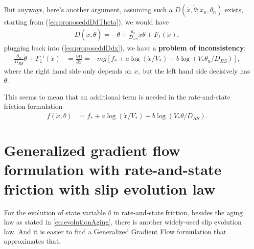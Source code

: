 But anyways, 
here's another argument, 
assuming such a $D(\dot{x}, \dot{\theta}; x_n, \theta_n)$ exists, 
starting from (\ref{eq:proposeddDdTheta}), 
we would have 
\begin{align}
    D(\dot{x}, \dot{\theta}) = -\dot{\theta} + \frac{\theta_n}{D_{RS}} \dot{x}\dot{\theta} + F_1(\dot{x}) \label{eq:DefF1}, 
\end{align}
plugging back into (\ref{eq:proposeddDdx}), 
we have a \textbf{problem of inconsistency}:
\begin{align}
    \frac{\theta_n}{D_{RS}} \dot{\theta} + F_1'(\dot{x}) &= \frac{\partial D}{\partial \dot{x}} = -mg\left[f_* + a\log(\dot{x}/V_*) + b \log(V_* \theta_n / D_{RS})\right] \label{eq:InconsProb}, 
\end{align}
where the right hand side only depends on $\dot{x}$, 
but the left hand side decisively has $\dot{\theta}$. 

This seems to mean that an additional term is needed in the rate-and-state friction formulation 
\begin{align*}
    f(\dot{x}, \theta) &= f_* + a\log(\dot{x}/V_*) + b\log(V_*\theta / D_{RS}). 
\end{align*}

\section{Generalized gradient flow formulation with rate-and-state friction with slip evolution law}
For the evolution of state variable $\theta$ in rate-and-state friction, 
besides the aging law as stated in \ref{eq:evolutionAging}, 
there is another widely-used slip evolution law. 
And it is easier to find a Generalized Gradient Flow formulation that approximates that. 

